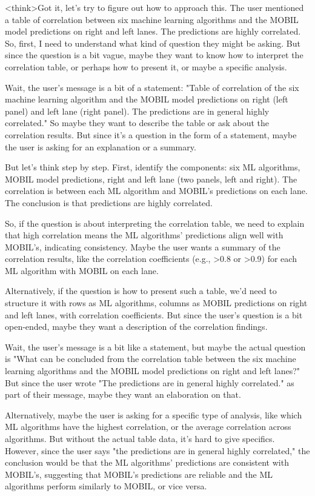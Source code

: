 <think>Got it, let's try to figure out how to approach this. The user mentioned a table of correlation between six machine learning algorithms and the MOBIL model predictions on right and left lanes. The predictions are highly correlated. So, first, I need to understand what kind of question they might be asking. But since the question is a bit vague, maybe they want to know how to interpret the correlation table, or perhaps how to present it, or maybe a specific analysis.

Wait, the user's message is a bit of a statement: "Table of correlation of the six machine learning algorithm and the MOBIL model predictions on right (left panel) and left lane (right panel). The predictions are in general highly correlated." So maybe they want to describe the table or ask about the correlation results. But since it's a question in the form of a statement, maybe the user is asking for an explanation or a summary.

But let's think step by step. First, identify the components: six ML algorithms, MOBIL model predictions, right and left lane (two panels, left and right). The correlation is between each ML algorithm and MOBIL's predictions on each lane. The conclusion is that predictions are highly correlated.

So, if the question is about interpreting the correlation table, we need to explain that high correlation means the ML algorithms' predictions align well with MOBIL's, indicating consistency. Maybe the user wants a summary of the correlation results, like the correlation coefficients (e.g., >0.8 or >0.9) for each ML algorithm with MOBIL on each lane.

Alternatively, if the question is how to present such a table, we'd need to structure it with rows as ML algorithms, columns as MOBIL predictions on right and left lanes, with correlation coefficients. But since the user's question is a bit open-ended, maybe they want a description of the correlation findings.

Wait, the user's message is a bit like a statement, but maybe the actual question is "What can be concluded from the correlation table between the six machine learning algorithms and the MOBIL model predictions on right and left lanes?" But since the user wrote "The predictions are in general highly correlated." as part of their message, maybe they want an elaboration on that.

Alternatively, maybe the user is asking for a specific type of analysis, like which ML algorithms have the highest correlation, or the average correlation across algorithms. But without the actual table data, it's hard to give specifics. However, since the user says "the predictions are in general highly correlated," the conclusion would be that the ML algorithms' predictions are consistent with MOBIL's, suggesting that MOBIL's predictions are reliable and the ML algorithms perform similarly to MOBIL, or vice versa.

